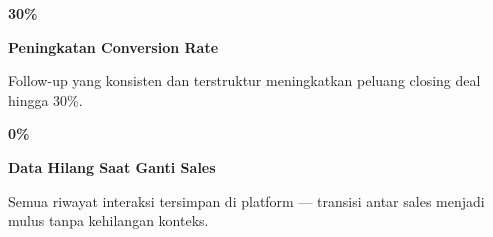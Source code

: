 \documentclass[a4paper]{article}
\begin{document}
\noindent
\begin{minipage}[t]{0.485\textwidth}
    \noindent\colorbox{BlueBg}{%
        \begin{minipage}[t][2.7cm][c]{\dimexpr\linewidth-2\fboxsep\relax}
            \centering
            {\fontsize{20}{24}\selectfont\bfseries\color{RosePrimary} 30\%}\par\vspace{2pt}
            {\fontsize{9.5}{12}\selectfont\bfseries\color{BlueDark} Peningkatan Conversion Rate}\par\vspace{2pt}
            {\fontsize{8.5}{11}\selectfont\color{TextDark}Follow-up yang konsisten dan terstruktur meningkatkan peluang closing deal hingga 30\%.}
        \end{minipage}}\par
    \vspace{6pt}
    \noindent\colorbox{BlueBg}{%
        \begin{minipage}[t][2.7cm][c]{\dimexpr\linewidth-2\fboxsep\relax}
            \centering
            {\fontsize{20}{24}\selectfont\bfseries\color{RosePrimary} 0\%}\par\vspace{2pt}
            {\fontsize{9.5}{12}\selectfont\bfseries\color{BlueDark} Data Hilang Saat Ganti Sales}\par\vspace{2pt}
            {\fontsize{8.5}{11}\selectfont\color{TextDark}Semua riwayat interaksi tersimpan di platform — transisi antar sales menjadi mulus tanpa kehilangan konteks.}
        \end{minipage}}%
\end{minipage}%
\hfill
\end{document}
